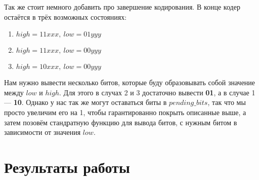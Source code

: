 \documentclass[fontsize=13pt]{article}
\begin{document}
Так же стоит немного добавить про завершение кодирования. В конце кодер остаётся в трёх возможных состояниях:
\begin{enumerate}
	\item $high=11xxx,\ low=01yyy$
	\item $high=11xxx,\ low=00yyy$
	\item $high=10xxx,\ low=00yyy$
\end{enumerate}

Нам нужно вывести несколько битов, которые буду образовывать собой значение между $low$ и $high$. Для этого в случах 2 и 3 достаточно вывести \textbf{01}, а в случае 1 --- \textbf{10}. Однако у нас так же могут оставаться биты в $pending\_bits$, так что мы просто увеличим его на 1, чтобы гарантированно покрыть описанные выше, а затем позовём стандратную функцию для вывода битов, с нужным битом в зависимости от значения $low$.  

\section*{Результаты работы}
\end{document}

